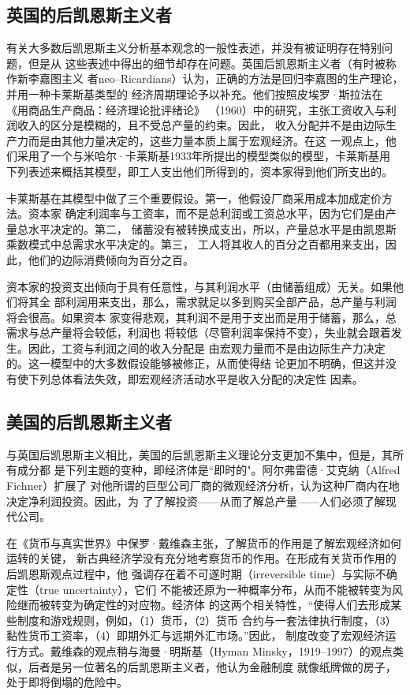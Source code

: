 \subsection{英国的后凯恩斯主义者}

有关大多数后凯恩斯主义分析基本观念的一般性表述，并没有被证明存在特别问题，但是从
这些表述中得出的细节却存在问题。英国后凯恩斯主义者（有时被称作新李嘉图主义
者neo--Ricardians）认为，正确的方法是回归李嘉图的生产理论，并用一种卡莱斯基类型的
经济周期理论予以补充。他们按照皮埃罗·斯拉法在《用商品生产商品：经济理论批评绪论》
（1960）中的研究，主张工资收入与利润收入的区分是模糊的，且不受总产量的约束。因此，
收入分配并不是由边际生产力而是由其他力量决定的，这些力量本质上属于宏观经济。在这
一观点上，他们采用了一个与米哈尔·卡莱斯基1933年所提出的模型类似的模型，卡莱斯基用
下列表述来概括其模型，即工人支出他们所得到的，资本家得到他们所支出的。

卡莱斯基在其模型中做了三个重要假设。第一，他假设厂商采用成本加成定价方法。资本家
确定利润率与工资率，而不是总利润或工资总水平，因为它们是由产量总水平决定的。第二，
储蓄没有被转换成支出，所以，产量总水平是由凯恩斯乘数模式中总需求水平决定的。第三，
工人将其收人的百分之百都用来支出，因此，他们的边际消费倾向为百分之百。

资本家的投资支出倾向于具有任意性，与其利润水平（由储蓄组成）无关。如果他们将其全
部利润用来支出，那么，需求就足以多到购买全部产品，总产量与利润将会很高。如果资本
家变得悲观，其利润不是用于支出而是用于储蓄，那么，总需求与总产量将会较低，利润也
将较低（尽管利润率保持不变），失业就会跟着发生。因此，工资与利润之间的收入分配是
由宏观力量而不是由边际生产力决定的。这一模型中的大多数假设能够被修正，从而使得结
论更加不明确，但这并没有使下列总体看法失效，即宏观经济活动水平是收入分配的决定性
因素。

\subsection{美国的后凯恩斯主义者}

与英国后凯恩斯主义相比，美国的后凯恩斯主义理论分支更加不集中，但是，其所有成分都
是下列主题的变种，即经济体是“即时的"。阿尔弗雷德·艾克纳（Alfred Fichner）扩展了
对他所谓的巨型公司厂商的微观经济分析，认为这种厂商内在地决定净利润投资。因此，为
了了解投资——从而了解总产量——人们必须了解现代公司。

在《货币与真实世界》中保罗·戴维森主张，了解货币的作用是了解宏观经济如何运转的关键，
新古典经济学没有充分地考察货币的作用。在形成有关货币作用的后凯恩斯观点过程中，他
强调存在着不可遂时期（irreversible time）与实际不确定性（true uncertainty），它们
不能被还原为一种概率分布，从而不能被转变为风险继而被转变为确定性的对应物。经济体
的这两个相关特性，“使得人们去形成某些制度和游戏规则，例如，（1）货币，（2）货币
合约与一套法律执行制度，（3）黏性货币工资率，（4）即期外汇与远期外汇市场。”因此，
制度改变了宏观经济运行方式。戴维森的观点稍与海曼·明斯基（Hyman
Minsky，1919--1997）的观点类似，后者是另一位著名的后凯恩斯主义者，他认为金融制度
就像纸牌做的房子，处于即将倒塌的危险中。

